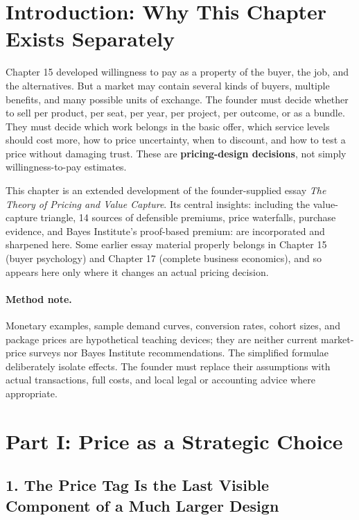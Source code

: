 \section*{Introduction: Why This Chapter Exists Separately}

Chapter 15 developed willingness to pay as a property of the buyer, the job, and the alternatives. But a market may contain several kinds of buyers, multiple benefits, and many possible units of exchange. The founder must decide whether to sell per product, per seat, per year, per project, per outcome, or as a bundle. They must decide which work belongs in the basic offer, which service levels should cost more, how to price uncertainty, when to discount, and how to test a price without damaging trust. These are \textbf{pricing-design decisions}, not simply willingness-to-pay estimates.

This chapter is an extended development of the founder-supplied essay \emph{The Theory of Pricing and Value Capture}. Its central insights: including the value-capture triangle, 14 sources of defensible premiums, price waterfalls, purchase evidence, and Bayes Institute's proof-based premium: are incorporated and sharpened here. Some earlier essay material properly belongs in Chapter 15 (buyer psychology) and Chapter 17 (complete business economics), and so appears here only where it changes an actual pricing decision.

\paragraph{Method note.} Monetary examples, sample demand curves, conversion rates, cohort sizes, and package prices are hypothetical teaching devices; they are neither current market-price surveys nor Bayes Institute recommendations. The simplified formulae deliberately isolate effects. The founder must replace their assumptions with actual transactions, full costs, and local legal or accounting advice where appropriate.

\section*{Part I: Price as a Strategic Choice}

\subsection*{1. The Price Tag Is the Last Visible Component of a Much Larger Design}

